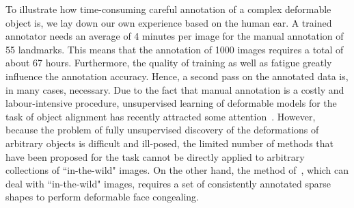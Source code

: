 To illustrate how time-consuming careful annotation of a complex deformable object is, we lay down our own experience based on the human ear. A trained annotator needs an average of 4 minutes per image for the manual annotation of 55 landmarks. This means that the annotation of 1000 images requires a total of about 67 hours. Furthermore, the quality of training as well as fatigue greatly influence the annotation accuracy. Hence, a second pass on the annotated data is, in many cases, necessary. Due to the fact that manual annotation is a costly and labour-intensive procedure, unsupervised learning of deformable models for the task of object alignment has recently attracted some attention~\cite{frey2003learning, baker2004automatic, cootes2004groupwise, jojic2006escaping, Huang2006, kokkinos2007unsupervised, jiang2009learning, liu2009simultaneous, Zhang2012}. However, because the problem of fully unsupervised discovery of the deformations of arbitrary objects is difficult and ill-posed, the limited number of methods that have been proposed for the task cannot be directly applied to arbitrary collections of ``in-the-wild" images. On the other hand, the method of~\cite{antonakos2014automatic}, which can deal with ``in-the-wild" images, requires a set of consistently annotated sparse shapes to perform deformable face congealing.

